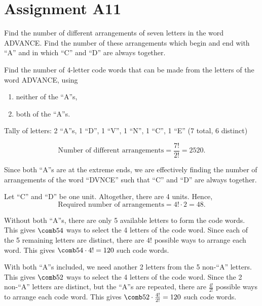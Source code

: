 \section{Assignment A11}

\begin{problem}
    Find the number of different arrangements of seven letters in the word ADVANCE. Find the number of these arrangements which begin and end with ``A'' and in which ``C'' and ``D'' are always together.

    Find the number of 4-letter code words that can be made from the letters of the word ADVANCE, using
    \begin{enumerate}
        \item neither of the ``A''s,
        \item both of the ``A''s.
    \end{enumerate}
\end{problem}
\begin{solution}
    Tally of letters: 2 ``A''s, 1 ``D'', 1 ``V'', 1 ``N'', 1 ``C'', 1 ``E'' (7 total, 6 distinct)

    \[\text{Number of different arrangements} = \frac{7!}{2!} = 2520.\]

    Since both ``A''s are at the extreme ends, we are effectively finding the number of arrangements of the word ``DVNCE'' such that ``C'' and ``D'' are always together.

    Let ``C'' and ``D'' be one unit. Altogether, there are 4 units. Hence, \[\text{Required number of arrangements} = 4! \cdot 2 = 48.\]
    
    \begin{ppart}
        Without both ``A''s, there are only 5 available letters to form the code words. This gives $\comb54$ ways to select the 4 letters of the code word. Since each of the 5 remaining letters are distinct, there are $4!$ possible ways to arrange each word. This gives $\comb54 \cdot 4! = 120$ such code words.
    \end{ppart}
    \begin{ppart}
        With both ``A''s included, we need another 2 letters from the 5 non-``A'' letters. This gives $\comb52$ ways to select the 4 letters of the code word. Since the 2 non-``A'' letters are distinct, but the ``A''s are repeated, there are $\frac{4!}{2!}$ possible ways to arrange each code word. This gives $\comb52 \cdot \frac{4!}{2!} = 120$ such code words.
    \end{ppart}
\end{solution}

